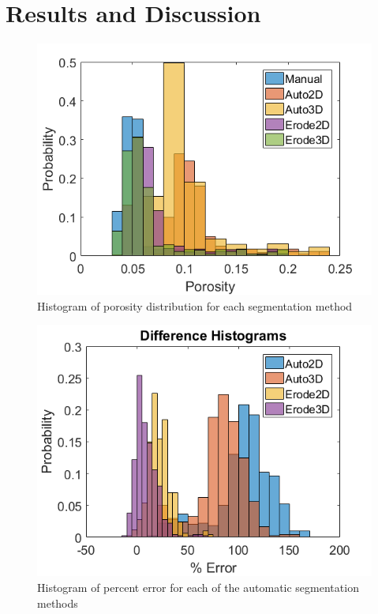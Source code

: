 \documentclass[12pt]{article}
\begin{document}
\section{Results and Discussion} 
\begin{figure}[H]
	\centering
	\includegraphics[width=1\textwidth]{DataHistograms.png}
	\caption{Histogram of porosity distribution for each segmentation method}
	\label{fig:DataHist}
\end{figure}

\begin{figure}[H]
	\centering
	\includegraphics[width=1\textwidth]{DifferenceHistograms.png}
	\caption{Histogram of percent error for each of the automatic segmentation methods}
	\label{fig:DiffHist}
\end{figure}
\end{document}
